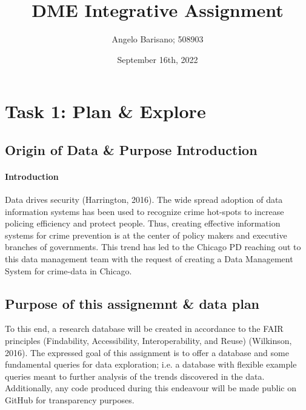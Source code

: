 \documentclass[a4paper]{article}
\begin{document}
\title{DME Integrative Assignment}
\author{Angelo Barisano; 508903 }
\date{September 16th, 2022}
\maketitle

\newpage




\section{Task 1: Plan \& Explore}


\subsection{Origin of Data \& Purpose Introduction}
\paragraph{Introduction} Data drives security (Harrington, 2016). The wide spread adoption of data information systems has been used to recognize crime hot-spots to increase policing efficiency and protect people. Thus, creating effective information systems for crime prevention is at the center of policy makers and executive branches of governments. This trend has led to the Chicago PD reaching out to this data management team with the request of creating a Data Management System for crime-data in Chicago.

\subsection{Purpose of this assignemnt \& data plan}

To this end, a research database will be created in accordance to the FAIR principles (Findability, Accessibility, Interoperability, and Reuse) (Wilkinson, 2016). The expressed goal of this assignment is to offer a database and some fundamental queries for data exploration; i.e. a database with flexible example queries meant to further analysis of the trends discovered in the data. Additionally, any code produced during this endeavour will be made public on GitHub for transparency purposes. 
\end{document}
